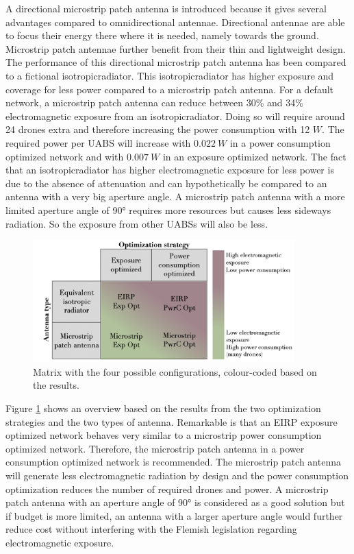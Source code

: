 A directional microstrip patch antenna is introduced because it gives several advantages compared to omnidirectional antennae.
Directional antennae are able to focus their energy there where it is needed, namely towards the ground. Microstrip patch antennae 
further benefit from their thin and lightweight design. The performance 
of this directional microstrip patch antenna has been compared to a 
fictional \gls{isotropicradiator}.
This \gls{isotropicradiator} has higher exposure and coverage for less power compared to a microstrip patch antenna.
For a default network, a microstrip patch antenna can reduce between 30\% and 34\% electromagnetic exposure 
from an \gls{isotropicradiator}. Doing so will require around 24 drones extra and therefore increasing the power consumption with 12 $W$.
The required power per \gls{UABS} will increase with $0.022\ W$ 
in a power consumption optimized network and with $0.007\ W$ in an exposure optimized network.
The fact that an \gls{isotropicradiator} has higher electromagnetic exposure for less power  is due to the absence of 
attenuation and can hypothetically be compared to an antenna with a very big aperture angle.
A microstrip patch antenna with a more limited aperture angle of \ang{90} requires more resources but 
causes less sideways radiation. So the exposure from other \gls{UABS}s will also be less.

\begin{figure}[hb!]
\centering
  \includegraphics[width=0.9\textwidth]{../images/fourCasesMatrixSol.png}
  \caption{Matrix with the four possible configurations, colour-coded based on the results.}
  \label{fig:resultIllustration}
\end{figure}

Figure \ref{fig:resultIllustration} shows an overview based on the results from the two optimization strategies and the two types of antenna.
Remarkable is that an \gls{EIRP} exposure optimized network behaves very similar to a microstrip power consumption optimized network.
Therefore, the microstrip patch antenna in a power consumption optimized network is recommended. 
The microstrip patch antenna will generate less electromagnetic radiation by design and
 the power consumption optimization reduces the number of required drones and power. A microstrip patch antenna with an aperture 
 angle of \ang{90} is considered as a good solution but if budget is more limited, an antenna with a larger aperture angle 
 would further reduce cost without interfering with the Flemish legislation regarding electromagnetic exposure.


